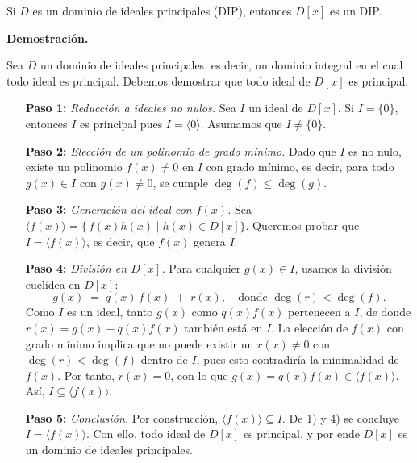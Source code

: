 Si $D$ es un dominio de ideales principales (DIP), entonces $D[x]$ es un DIP.

\textbf{Demostraci\'on.} 

Sea $D$ un dominio de ideales principales, es decir, un dominio integral en el cual todo ideal es principal. Debemos demostrar que todo ideal de $D[x]$ es principal.


\begin{enumerate}
\item[\textbf{Paso 1:}] \textit{Reducci\'on a ideales no nulos.}  
Sea $I$ un ideal de $D[x]$. Si $I = \{0\}$, entonces $I$ es principal pues $I = \langle 0 \rangle$. Asumamos que $I \neq \{0\}$.

\item[\textbf{Paso 2:}] \textit{Elecci\'on de un polinomio de grado m\'inimo.}  
Dado que $I$ es no nulo, existe un polinomio $f(x)\neq 0$ en $I$ con grado m\'inimo, es decir, para todo $g(x) \in I$ con $g(x)\neq 0$, se cumple $\deg(f)\leq \deg(g)$.

\item[\textbf{Paso 3:}] \textit{Generaci\'on del ideal con $f(x)$.}  
Sea $\langle f(x)\rangle = \{\,f(x)h(x)\mid h(x)\in D[x]\}$. Queremos probar que $I=\langle f(x)\rangle$, es decir, que $f(x)$ genera $I$.

\item[\textbf{Paso 4:}] \textit{Divisi\'on en $D[x]$.}  
Para cualquier $g(x)\in I$, usamos la divisi\'on eucl\'idea en $D[x]$:  
\[
g(x) \;=\; q(x)\,f(x)\;+\; r(x),
\quad\text{donde } \deg(r)<\deg(f).
\]
Como $I$ es un ideal, tanto $g(x)$ como $q(x)f(x)$ pertenecen a $I$, de donde $r(x) = g(x) - q(x)f(x)$ tambi\'en est\'a en $I$.  
La elecci\'on de $f(x)$ con grado m\'inimo implica que no puede existir un $r(x)\neq 0$ con $\deg(r)<\deg(f)$ dentro de $I$, pues esto contradir\'ia la minimalidad de $f(x)$. Por tanto, $r(x)=0$, con lo que $g(x)=q(x)f(x)\in \langle f(x)\rangle$. As\'i, $I\subseteq \langle f(x)\rangle$.

\item[\textbf{Paso 5:}] \textit{Conclusi\'on.}  
Por construcci\'on, $\langle f(x)\rangle\subseteq I$. De 1) y 4) se concluye $I=\langle f(x)\rangle$. Con ello, todo ideal de $D[x]$ es principal, y por ende $D[x]$ es un dominio de ideales principales.

\end{enumerate}
